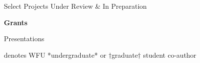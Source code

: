 \documentclass[11pt,letterpaper]{article} %
\begin{document}






\begin{rSection}{ \textrm{Select Projects Under Review \& In Preparation}}

{\large \textbf{Grants}}
\begin{etaremune}

\end{etaremune}%

%

%
\end{rSection}
%
\begin{rSection}{\textrm{Presentations}} %
%
\vspace{-1mm}\begin{center}\footnotesize{denotes WFU *undergraduate* or $\dagger$graduate$\dagger$ student co-author}\end{center}\vspace{-5mm}


\end{rSection}
\end{document}
